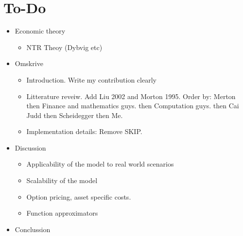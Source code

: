 \documentclass[11pt]{article}
\begin{document}
\section{To-Do}\label{sec:To-Do}
\begin{itemize}
  \item Economic theory
      \begin{itemize}
        \item NTR Theoy (Dybvig etc)
      \end{itemize}
  \item Omskrive
\begin{itemize}
  \item Introduction. Write my contribution clearly
  \item Litterature reveiw. Add Liu 2002 and Morton 1995. Order by: Merton then Finance and mathematics guys. then Computation guys. then Cai Judd then Scheidegger then Me.
  \item Implementation details: Remove SKIP.
\end{itemize}
\item Discussion
\begin{itemize}
  \item Applicability of the model to real world scenarios
  \item Scalability of the model
  \item Option pricing, asset specific costs.
  \item Function approximators 
\end{itemize}
\item Conclussion 
\end{itemize}





% 



\newpage

\begingroup 
  \hypersetup{linkcolor=black}

  \hypersetup{
    colorlinks=true,
    citecolor=black,
    linkcolor=black,
    filecolor=black, 
    urlcolor=black}
  \printbibliography
\endgroup

\newpage


\end{document}
